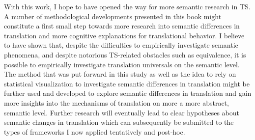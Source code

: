 With this work, I hope to have opened the way for more semantic research in TS. A number of methodological developments presented in this book might constitute a first small step towards more research into semantic differences in translation and more cognitive explanations for translational behavior. I believe to have shown that, despite the difficulties to empirically investigate semantic phenomena, and despite notorious TS-related obstacles such as equivalence, it is possible to empirically investigate translation universals on the semantic level. The method that was put forward in this study as well as the idea to rely on statistical visualization to investigate semantic differences in translation might be further used and developed to explore semantic differences in translation and gain more insights into the mechanisms of translation on more a more abstract, semantic level. Further research will eventually lead to clear hypotheses about semantic changes in translation which can subsequently be submitted to the types of frameworks I now applied tentatively and post-hoc.

